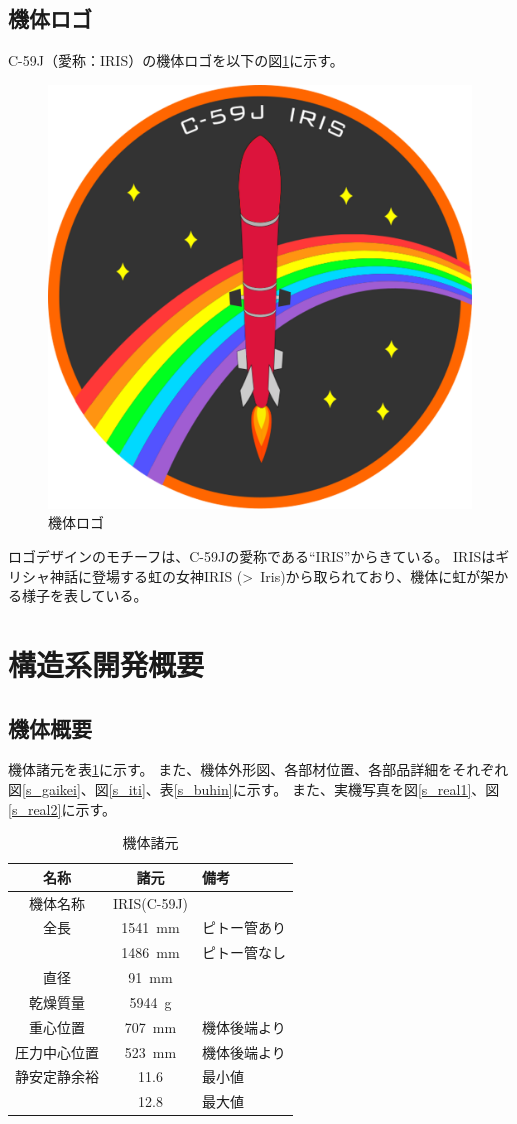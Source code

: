 \documentclass[a4paper,11pt,uplatex]{jsarticle}
\begin{document}
\subsection{機体ロゴ}
C-59J（愛称：IRIS）の機体ロゴを以下の図\ref{fig:sum_kitairogo}に示す。
\begin{figure}[H]
	\centering
	\includegraphics[width=0.5\linewidth]{pic_summary/newlogo.png}
	\caption{機体ロゴ}
	\label{fig:sum_kitairogo}
\end{figure}
ロゴデザインのモチーフは、C-59Jの愛称である``IRIS''からきている。
IRISはギリシャ神話に登場する虹の女神IRIS (\foreignlanguage{greek}{{>~I}ris})から取られており、機体に虹が架かる様子を表している。

\newpage
\section{構造系開発概要}
\subsection{機体概要}
機体諸元を表\ref{s_59syogen}に示す。
また、機体外形図、各部材位置、各部品詳細をそれぞれ図\ref{s_gaikei}、図\ref{s_iti}、表\ref{s_buhin}に示す。
また、実機写真を図\ref{s_real1}、図\ref{s_real2}に示す。

\begin{table}[H]
	\centering
	\caption{機体諸元}
	\begin{tabular}{ccl} \toprule
		名称     & 諸元            & 備考     \\\midrule
		機体名称   & IRIS(C-59J)            \\
		全長     & \SI{1541}{mm} & ピトー管あり \\
		       & \SI{1486}{mm} & ピトー管なし \\
		直径     & \SI{91}{mm}            \\
		乾燥質量   & \SI{5944}{g}           \\
		重心位置   & \SI{707}{mm}  & 機体後端より \\
		圧力中心位置 & \SI{523}{mm}  & 機体後端より \\
		静安定静余裕 & 11.6          & 最小値    \\
		       & 12.8          & 最大値    \\
		\bottomrule
	\end{tabular}
	\label{s_59syogen}
\end{table}
\end{document}
